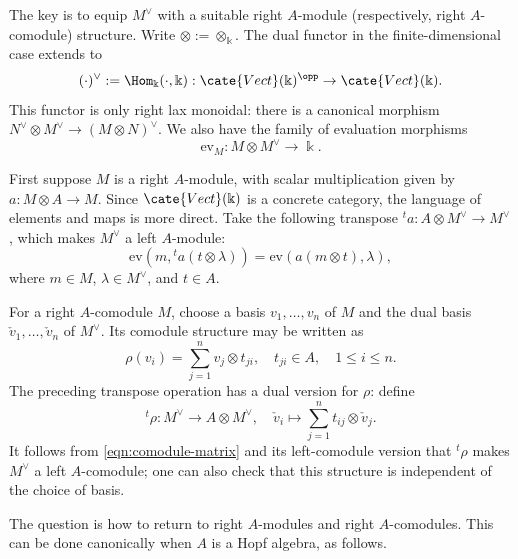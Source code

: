The key is to equip $M^\vee$ with a suitable right $A$-module (respectively,
right $A$-comodule) structure. Write $\otimes:=\otimes_{\Bbbk}$. The dual
functor in the finite-dimensional case extends to
\[ (\cdot)^\vee := \Hom_{\Bbbk}(\cdot, \Bbbk): \cate{Vect}(\Bbbk)^{\opp} \to \cate{Vect}(\Bbbk). \]
This functor is only right lax monoidal: there is a canonical morphism
$N^\vee\otimes M^\vee\to(M\otimes N)^\vee$. We also have the family of
evaluation morphisms
\[ \mathrm{ev}_M: M \otimes M^\vee \to \Bbbk. \]

First suppose $M$ is a right $A$-module, with scalar multiplication given by
$a:M\otimes A\to M$. Since $\cate{Vect}(\Bbbk)$ is a concrete category, the
language of elements and maps is more direct. Take the following transpose
${}^ta:A\otimes M^\vee\to M^\vee$, which makes $M^\vee$ a left $A$-module:
\[ \mathrm{ev}\left(m, {}^t a(t \otimes \lambda)\right) = \mathrm{ev}\left( a(m \otimes t), \lambda \right), \]
where $m\in M$, $\lambda\in M^\vee$, and $t\in A$.

For a right $A$-comodule $M$, choose a basis $v_1,\ldots,v_n$ of $M$ and the
dual basis $\check v_1,\ldots,\check v_n$ of $M^\vee$. Its comodule structure
may be written as
\begin{equation}\label{eqn:comodule-basis}
	\rho(v_i) = \sum_{j=1}^n v_j \otimes t_{ji}, \quad t_{ji} \in A, \quad 1 \leq i \leq n.
\end{equation}
The preceding transpose operation has a dual version for $\rho$: define
\[ {}^t \rho: M^\vee \to A \otimes M^\vee, \quad \check{v}_i \mapsto \sum_{j=1}^n t_{ij} \otimes \check{v}_j. \]
It follows from \eqref{eqn:comodule-matrix} and its left-comodule version that
${}^t\rho$ makes $M^\vee$ a left $A$-comodule; one can also check that this
structure is independent of the choice of basis.

The question is how to return to right $A$-modules and right $A$-comodules.
This can be done canonically when $A$ is a Hopf algebra, as follows.

